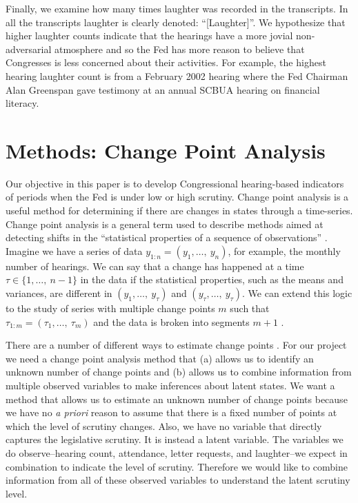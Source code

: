 \documentclass[a4paper]{article}\usepackage[]{graphicx}\usepackage[]{color}
\begin{document}
Finally, we examine how many times laughter was recorded in the transcripts. In all the transcripts laughter is clearly denoted: ``[Laughter]''. We hypothesize that higher laughter counts indicate that the hearings have a more jovial non-adversarial atmosphere and so the Fed has more reason to believe that Congresses is less concerned about their activities. For example, the highest hearing laughter count is from a February 2002 hearing where the Fed Chairman Alan Greenspan gave testimony at an annual SCBUA hearing on financial literacy.

\section{Methods: Change Point Analysis}

Our objective in this paper is to develop Congressional hearing-based indicators of periods when the Fed is under low or high scrutiny. Change point analysis is a useful method for determining if there are changes in states through a time-series. Change point analysis is a general term used to describe methods aimed at detecting shifts in the ``statistical properties of a sequence of observations'' \cite[2]{Killick2013}. Imagine we have a series of data $y_{1:n} = (y_{1},\ldots,\: y_{n})$, for example, the monthly number of hearings.  We can say that a change has happened at a time $\tau \in \{1,\ldots,\:n-1\}$ in the data if the statistical properties, such as the means and variances, are different in $(y_{1},\ldots,\: y_{\tau})$ and $(y_{\tau},\ldots,\: y_{\tau})$. We can extend this logic to the study of series with multiple change points $m$ such that $\tau_{1:m} = (\tau_{1},\ldots,\:\tau_{m})$ and the data is broken into segments $m + 1$ \citep{Killick2012}.

There are a number of different ways to estimate change points \cite[see][]{Killick2013,Matteson2014}. For our project we need a change point analysis method that (a) allows us to identify an unknown number of change points and (b) allows us to combine information from multiple observed variables to make inferences about latent states. We want a method that allows us to estimate an unknown number of change points because we have no \emph{a priori} reason to assume that there is a fixed number of points at which the level of scrutiny changes. Also, we have no variable that directly captures the legislative scrutiny. It is instead a latent variable. The variables we do observe--hearing count, attendance, letter requests, and laughter--we expect in combination to indicate the level of scrutiny. Therefore we would like to combine information from all of these observed variables to understand the latent scrutiny level.
\end{document}

